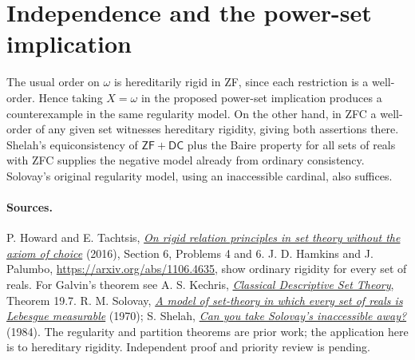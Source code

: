 \documentclass[11pt]{article}
\begin{document}
\section{Independence and the power-set implication}
The usual order on $\omega$ is hereditarily rigid in ZF, since each restriction is a well-order. Hence taking $X=\omega$ in the proposed power-set implication produces a counterexample in the same regularity model. On the other hand, in ZFC a well-order of any given set witnesses hereditary rigidity, giving both assertions there. Shelah's equiconsistency of $\mathsf{ZF}+\mathsf{DC}$ plus the Baire property for all sets of reals with ZFC supplies the negative model already from ordinary consistency. Solovay's original regularity model, using an inaccessible cardinal, also suffices.
\paragraph{Sources.} P. Howard and E. Tachtsis, \href{https://doi.org/10.4064/fm960-12-2015}{\emph{On rigid relation principles in set theory without the axiom of choice}} (2016), Section 6, Problems 4 and 6. J. D. Hamkins and J. Palumbo, \url{https://arxiv.org/abs/1106.4635}, show ordinary rigidity for every set of reals. For Galvin's theorem see A. S. Kechris, \href{https://doi.org/10.1007/978-1-4612-4190-4}{\emph{Classical Descriptive Set Theory}}, Theorem 19.7. R. M. Solovay, \href{https://people.math.wisc.edu/~awmille1/old/m873-03/solovay.pdf}{\emph{A model of set-theory in which every set of reals is Lebesgue measurable}} (1970); S. Shelah, \href{https://shelah.logic.at/papers/176/}{\emph{Can you take Solovay's inaccessible away?}} (1984). The regularity and partition theorems are prior work; the application here is to hereditary rigidity. Independent proof and priority review is pending.
\end{document}

